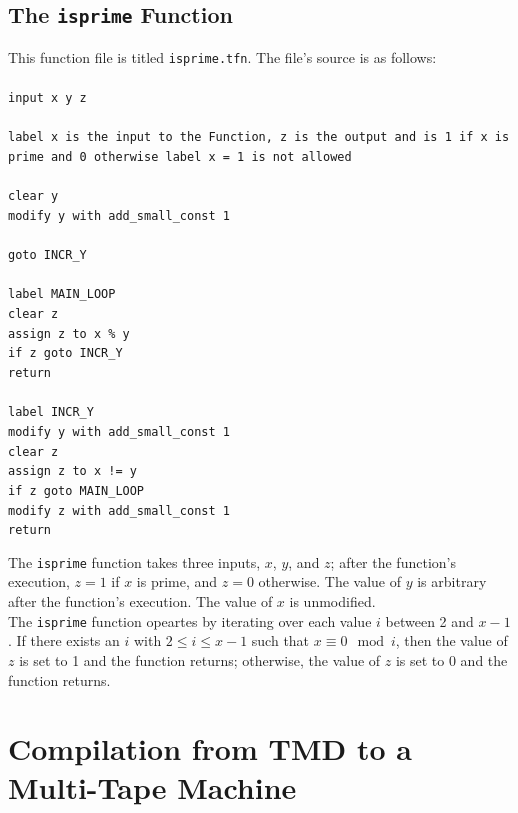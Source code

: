 \documentclass[11pt]{report}
\begin{document}
\subsection{The \texttt{isprime} Function}

This function file is titled \texttt{isprime.tfn}. The file's source is as follows: \\ \\
{\tt input x y z \\ \\
label x is the input to the Function, z is the output and is 1 if x is prime and 0 otherwise
label x = 1 is not allowed \\ \\
clear y \\
modify y with add\_small\_const 1 \\ \\ 
goto INCR\_Y \\ \\
label MAIN\_LOOP \\
clear z \\
assign z to x \% y \\
if z goto INCR\_Y \\
return \\ \\
label INCR\_Y \\
modify y with add\_small\_const 1 \\
clear z \\
assign z to x != y \\
if z goto MAIN\_LOOP \\
modify z with add\_small\_const 1 \\
return \\ }

The \texttt{isprime} function takes three inputs, $x$, $y$, and $z$; after the function's execution, $z = 1$ if $x$ is prime, and $z = 0$ otherwise. The value of $y$ is arbitrary after the function's execution. The value of $x$ is unmodified. \\

The \texttt{isprime} function opeartes by iterating over each value $i$ between 2 and $x-1$. If there exists an $i$ with $2 \le i \le x-1$ such that $x \equiv 0 \mod i$, then the value of $z$ is set to 1 and the function returns; otherwise, the value of $z$ is set to 0 and the function returns. \\

\section{Compilation from TMD to a Multi-Tape Machine \label{sec:turdtotmgoldbach}}
\end{document}
